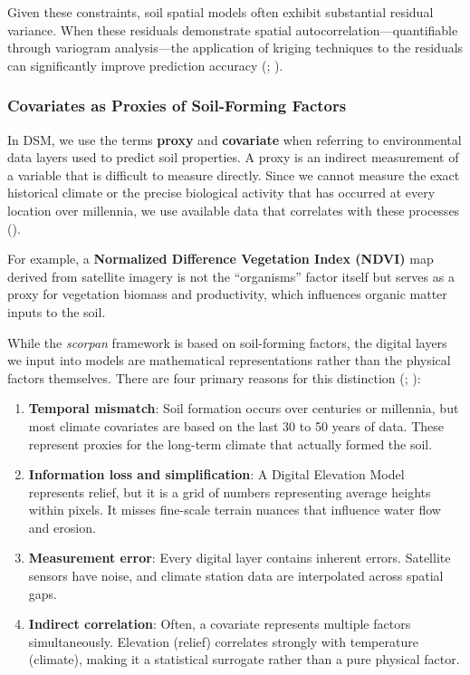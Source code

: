 \documentclass[
  10pt,
  b5paper,
  oneside]{book}
\providecommand{\tightlist}{%
  \setlength{\itemsep}{0pt}\setlength{\parskip}{0pt}}
\begin{document}
Given these constraints, soil spatial models often exhibit substantial residual variance. When these residuals demonstrate spatial autocorrelation---quantifiable through variogram analysis---the application of kriging techniques to the residuals can significantly improve prediction accuracy (; ).

\subsubsection{Covariates as Proxies of Soil-Forming Factors}\label{covariates-as-proxies-of-soil-forming-factors}

In DSM, we use the terms \textbf{proxy} and \textbf{covariate} when referring to environmental data layers used to predict soil properties. A proxy is an indirect measurement of a variable that is difficult to measure directly. Since we cannot measure the exact historical climate or the precise biological activity that has occurred at every location over millennia, we use available data that correlates with these processes ().

For example, a \textbf{Normalized Difference Vegetation Index (NDVI)} map derived from satellite imagery is not the ``organisms'' factor itself but serves as a proxy for vegetation biomass and productivity, which influences organic matter inputs to the soil.

While the \emph{scorpan} framework is based on soil-forming factors, the digital layers we input into models are mathematical representations rather than the physical factors themselves. There are four primary reasons for this distinction (; ):

\begin{enumerate}
\def\labelenumi{\arabic{enumi}.}
\tightlist
\item
  \textbf{Temporal mismatch}: Soil formation occurs over centuries or millennia, but most climate covariates are based on the last 30 to 50 years of data. These represent proxies for the long-term climate that actually formed the soil.
\item
  \textbf{Information loss and simplification}: A Digital Elevation Model represents relief, but it is a grid of numbers representing average heights within pixels. It misses fine-scale terrain nuances that influence water flow and erosion.
\item
  \textbf{Measurement error}: Every digital layer contains inherent errors. Satellite sensors have noise, and climate station data are interpolated across spatial gaps.
\item
  \textbf{Indirect correlation}: Often, a covariate represents multiple factors simultaneously. Elevation (relief) correlates strongly with temperature (climate), making it a statistical surrogate rather than a pure physical factor.
\end{enumerate}
\end{document}
